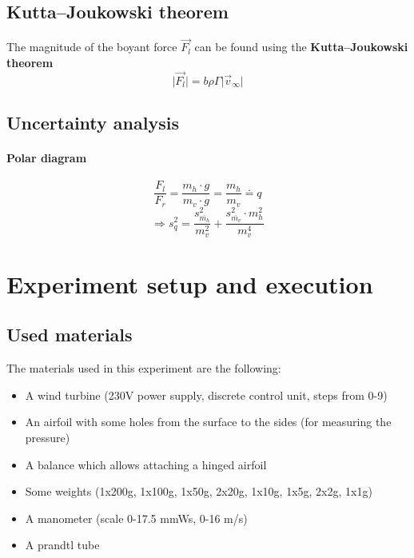 \documentclass{scrreprt}
\begin{document}
\subsection{Kutta–Joukowski theorem}
The magnitude of the boyant force $\vec{F_l}$ can be found using the \textbf{Kutta–Joukowski theorem} 
\begin{equation}
\lvert \vec{F_l}\rvert = b \rho \Gamma \lvert \vec{v}_\infty \rvert
\end{equation}

\subsection{Uncertainty analysis}
\paragraph*{Polar diagram}
\begin{equation}
\frac{F_l}{F_r} = \frac{m_h\cdot g}{m_v\cdot g} = \frac{m_h}{m_v} \doteq q
\end{equation}
\begin{equation}
\Longrightarrow s_q^2 = \frac{s_{\overline{m_h}}^2}{m_v^2} + \frac{s_{\overline{m_v}}^2 \cdot m_h^2}{m_v^4}
\end{equation}

\section{Experiment setup and execution}
\subsection{Used materials}
The materials used in this experiment are the following:
\begin{itemize}
\item A wind turbine (230V power supply, discrete control unit, steps from 0-9)
\item An airfoil with some holes from the surface to the sides (for measuring the pressure)
\item A balance which allows attaching a hinged airfoil
\item Some weights (1x200g, 1x100g, 1x50g, 2x20g, 1x10g, 1x5g, 2x2g, 1x1g)
\item A manometer (scale 0-17.5 mmWs, 0-16 m/s)
\item A prandtl tube
\end{itemize}
\end{document}
